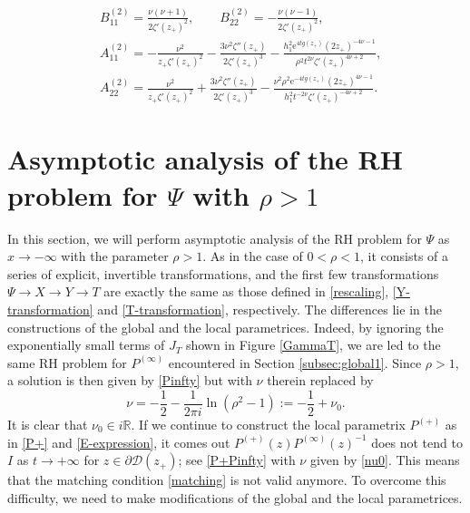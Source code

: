 \documentclass[11pt,a4paper]{article}
\numberwithin{equation}{section}
\begin{document}
\begin{align}\label{B(2)-expression}
&B^{(2)}_{11}=\frac{\nu(\nu+1)}{2\zeta'(z_+)^2},\qquad
B^{(2)}_{22}=-\frac{\nu(\nu-1)}{2\zeta'(z_+)^2},\\
&A^{(2)}_{11}=-\frac{\nu^2}{z_+\zeta'(z_+)^2}-\frac{3\nu^2\zeta''(z_+)}{2\zeta'(z_+)^3}
-\frac{h_1^2\mathrm{e}^{4tg(z_+)}(2z_+)^{-4\nu-1}}{\rho^2t^{2\nu}\zeta'(z_+)^{4\nu+2}},
\label{A(2)-11-expression}\\
&A^{(2)}_{22}=\frac{\nu^2}{z_+\zeta'(z_+)^2}+\frac{3\nu^2\zeta''(z_+)}{2\zeta'(z_+)^3}
-\frac{\nu^2\rho^2\mathrm{e}^{-4tg(z_+)}(2z_+)^{4\nu-1}}{h_1^2t^{-2\nu}\zeta'(z_+)^{-4\nu+2}}.
\label{A(2)-22-expression}
\end{align}

\section{Asymptotic analysis of the RH problem for $\Psi$ with $\rho>1$}
\label{RHanalysis2}
In this section, we will perform  asymptotic analysis of the RH problem for $\Psi$ as $x\to -\infty$ with the parameter $\rho>1$.
As in the case of $0<\rho<1$, it consists of a series of explicit, invertible transformations, and the first few transformations $\Psi\to{X}\to{Y}\to{T}$ are exactly the same as  those defined in  \eqref{rescaling}, \eqref{Y-transformation} and \eqref{T-transformation}, respectively. The differences lie in the constructions of the global and the local parametrices. Indeed, by ignoring the exponentially small terms of $J_T$ shown in Figure \ref{GammaT}, we are led to the same RH problem for ${P}^{(\infty)}$ encountered in Section \ref{subsec:global1}. Since $\rho>1$, a solution is then given by \eqref{Pinfty} but with $\nu$ therein replaced by
\begin{equation}\label{nu0}
\nu
=-\frac{1}{2}-\frac{1}{2\pi{i}}\ln(\rho^2-1)
:=-\frac{1}{2}+\nu_0.
\end{equation}
It is clear that $\nu_0\in{i}\mathbb{R}$. If we continue to construct the local parametrix $P^{(+)}$ as in \eqref{P+} and \eqref{E-expression}, it comes out $P^{(+)}(z)P^{(\infty)}(z)^{-1}$ does not tend to $I$ as $t\to+\infty$ for $z\in \partial\mathcal{D}(z_+)$; see \eqref{P+Pinfty} with $\nu$ given by \eqref{nu0}. This means that the matching condition \eqref{matching} is not valid anymore. To overcome this difficulty, we need to make modifications of the global and the local parametrices.
\end{document}
